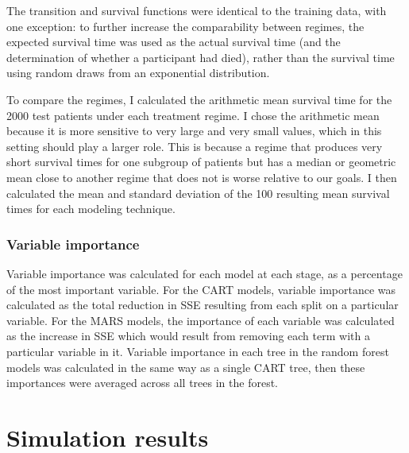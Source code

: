 \documentclass[12pt]{article}
\begin{document}
The transition and survival functions were identical to the training data, with one exception: to further increase the comparability between regimes, the expected survival time was used as the actual survival time (and the determination of whether a participant had died), rather than the survival time using random draws from an exponential distribution.

To compare the regimes, I calculated the arithmetic mean survival time for the 2000 test patients under each treatment regime. I chose the arithmetic mean because it is more sensitive to very large and very small values, which in this setting should play a larger role. This is because a regime that produces very short survival times for one subgroup of patients but has a median or geometric mean close to another regime that does not is worse relative to our goals. I then calculated the mean and standard deviation of the 100 resulting mean survival times for each modeling technique.

\subsubsection{Variable importance} %
\label{ssub:variable_importance}

Variable importance was calculated for each model at each stage, as a percentage of the most important variable. For the CART models, variable importance was calculated as the total reduction in SSE resulting from each split on a particular variable. For the MARS models, the importance of each variable was calculated as the increase in SSE which would result from removing each term with a particular variable in it. Variable importance in each tree in the random forest models was calculated in the same way as a single CART tree, then these importances were averaged across all trees in the forest.




\section{Simulation results} %
\label{sec:simulation_results}
\end{document}
